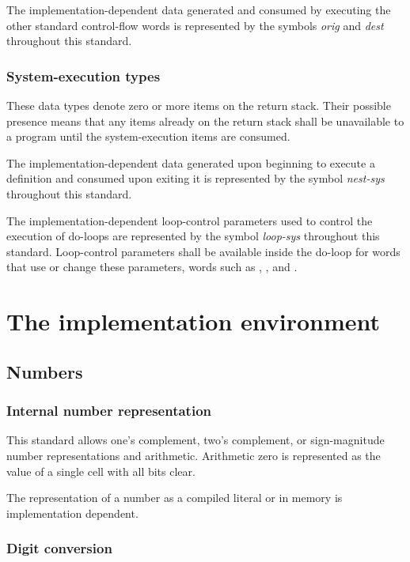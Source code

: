 The implementation-dependent data generated and consumed by executing
the other standard control-flow words is represented by the symbols
\emph{orig} and \emph{dest} throughout this standard.

\subsubsection{System-execution types} %

These data types denote zero or more items on the return stack.
Their possible presence means that any items already on the return
stack shall be unavailable to a program until the system-execution
items are consumed.

The implementation-dependent data generated upon beginning to
execute a definition and consumed upon exiting it is represented
by the symbol \emph{nest-sys} throughout this standard.

The implementation-dependent loop-control parameters used to
control the execution of do-loops are represented by the symbol
\emph{loop-sys} throughout this standard. Loop-control parameters
shall be available inside the do-loop for words that use or change
these parameters, words such as , , 
and .


\section{The implementation environment} %

\subsection{Numbers} %

\subsubsection{Internal number representation} %
\label{usage:number}

This standard allows one's complement, two's complement, or
sign-magnitude number representations and arithmetic. Arithmetic
zero is represented as the value of a single cell with all bits
clear.

The representation of a number as a compiled literal or in memory
is implementation dependent.

\subsubsection{Digit conversion} %
\label{usage:digits}

